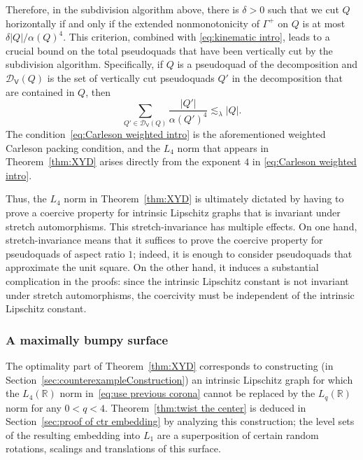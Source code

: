 \documentclass[11pt,reqno]{amsart}
\newcommand{\R}{\mathbb{R}}
\newcommand{\0}{\mathbf{0}}
\renewcommand{\1}{\mathbf 1}
\theoremstyle{remark}
\begin{document}
Therefore, in the subdivision algorithm above, there is  $\delta>0$ such that we cut $Q$ horizontally if and only if the extended nonmonotonicity of $\Gamma^+$ on $Q$ is at most $\delta |Q|/\alpha(Q)^{4}$.  This criterion, combined with \eqref{eq:kinematic intro}, leads to a crucial bound on the total pseudoquads that have been vertically cut by the subdivision algorithm.  Specifically, if $Q$ is a pseudoquad of the decomposition and $\mathcal{D}_{\mathsf{V}}(Q)$ is the set of vertically cut pseudoquads $Q'$ in the decomposition that are contained in $Q$, then
\begin{equation}\label{eq:Carleson weighted intro}
\sum_{Q'\in \mathcal{D}_{\mathsf{V}}(Q)} \frac{|Q'|}{\alpha(Q')^{4}}\lesssim_\lambda |Q|.
\end{equation}
The condition~\eqref{eq:Carleson weighted intro} is the aforementioned weighted Carleson packing condition, and the $L_4$ norm that appears in Theorem~\ref{thm:XYD} arises directly from the exponent $4$ in \eqref{eq:Carleson weighted intro}.

Thus, the $L_4$ norm in Theorem~\ref{thm:XYD} is ultimately dictated by having to prove a coercive property for intrinsic Lipschitz graphs that is invariant under stretch automorphisms.  This stretch-invariance has multiple effects.  On one hand, stretch-invariance means that it suffices to prove the coercive property for pseudoquads of aspect ratio $1$; indeed, it is enough to consider pseudoquads that approximate the unit square.  On the other hand, it induces a substantial complication in the proofs: since the intrinsic Lipschitz constant is not invariant under stretch automorphisms, the coercivity must be independent of the intrinsic Lipschitz constant.




\subsubsection{A maximally bumpy surface}\label{sec:maximally bumpy}
The optimality part of Theorem~\ref{thm:XYD} corresponds to constructing (in Section~\ref{sec:counterexampleConstruction}) an intrinsic Lipschitz graph for which the $L_4(\R)$ norm in~\eqref{eq:use previous corona} cannot be replaced by the $L_q(\R)$ norm for any $0<q<4$. Theorem~\ref{thm:twist the center} is deduced in Section~\ref{sec:proof of ctr embedding} by analyzing this construction; the level sets of the resulting embedding into $L_1$ are a superposition of certain random rotations, scalings and translations of this surface.
\end{document}
